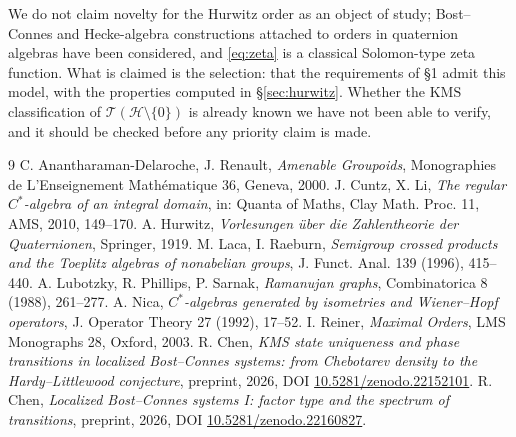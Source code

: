 \documentclass[11pt]{amsart}
\numberwithin{equation}{section}
\theoremstyle{definition}
\theoremstyle{remark}
\newcommand{\cH}{\mathcal{H}}
\newcommand{\cT}{\mathcal{T}}
\begin{document}
We do not claim novelty for the Hurwitz order as an object of study; Bost--Connes and
Hecke-algebra constructions attached to orders in quaternion algebras have been considered,
and \eqref{eq:zeta} is a classical Solomon-type zeta function. What is claimed is the
selection: that the requirements of \S1 admit this model, with the properties computed in
\S\ref{sec:hurwitz}. Whether the $\mathrm{KMS}$ classification of $\cT(\cH\setminus\{0\})$ is
already known we have not been able to verify, and it should be checked before any priority
claim is made.

\begin{thebibliography}{9}
 C. Anantharaman-Delaroche, J. Renault, \emph{Amenable Groupoids}, Monographies de L'Enseignement Math\'ematique 36, Geneva, 2000.
 J. Cuntz, X. Li, \emph{The regular $C^*$-algebra of an integral domain}, in: Quanta of Maths, Clay Math. Proc. 11, AMS, 2010, 149--170.
 A. Hurwitz, \emph{Vorlesungen \"uber die Zahlentheorie der Quaternionen}, Springer, 1919.
 M. Laca, I. Raeburn, \emph{Semigroup crossed products and the Toeplitz algebras of nonabelian groups}, J. Funct. Anal. 139 (1996), 415--440.
 A. Lubotzky, R. Phillips, P. Sarnak, \emph{Ramanujan graphs}, Combinatorica 8 (1988), 261--277.
 A. Nica, \emph{$C^*$-algebras generated by isometries and Wiener--Hopf operators}, J. Operator Theory 27 (1992), 17--52.
 I. Reiner, \emph{Maximal Orders}, LMS Monographs 28, Oxford, 2003.
 R. Chen, \emph{KMS state uniqueness and phase transitions in localized Bost--Connes systems: from Chebotarev density to the Hardy--Littlewood conjecture}, preprint, 2026, DOI \href{https://doi.org/10.5281/zenodo.22152101}{10.5281/zenodo.22152101}.
 R. Chen, \emph{Localized Bost--Connes systems I: factor type and the spectrum of transitions}, preprint, 2026, DOI \href{https://doi.org/10.5281/zenodo.22160827}{10.5281/zenodo.22160827}.
\end{thebibliography}
\end{document}
